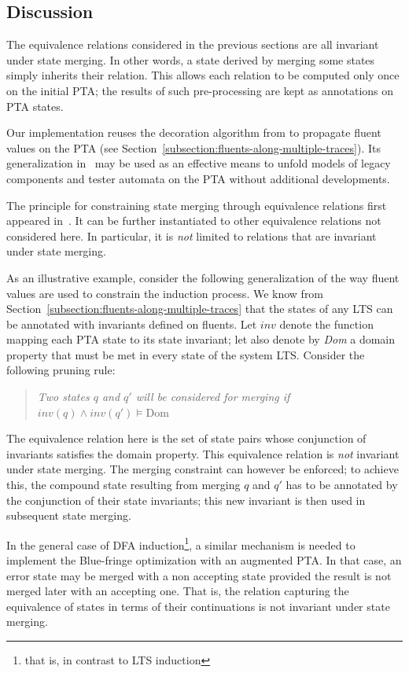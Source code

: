 \subsection{Discussion\label{subsection:qsm-constraints-implementation-notes}}

The equivalence relations considered in the previous sections are all invariant under state merging. In other words, a state derived by merging some states simply inherits their relation. This allows each relation to be computed only once on the initial PTA; the results of such pre-processing are kept as annotations on PTA states. 

Our implementation reuses the decoration algorithm from \cite{Damas:2006} to propagate fluent values on the PTA (see Section~\ref{subsection:fluents-along-multiple-traces}). Its generalization in~\cite{Damas:2011} may be used as an effective means to unfold models of legacy components and tester automata on the PTA without additional developments.

The principle for constraining state merging through equivalence relations first appeared in~\cite{Coste:1998, Coste:2004}. It can be further instantiated to other equivalence relations not considered here. In particular, it is \emph{not} limited to relations that are invariant under state merging.

As an illustrative example, consider the following generalization of the way fluent values are used to constrain the induction process. We know from Section~\ref{subsection:fluents-along-multiple-traces} that the states of any LTS can be annotated with invariants defined on fluents. Let $inv$ denote the function mapping each PTA state to its state invariant; let also denote by \emph{Dom} a domain property that must be met in every state of the system LTS. Consider the following pruning rule:
\begin{quote}
\emph{Two states $q$ and $q'$ will be considered for merging if $inv(q) \wedge inv(q') \models \mbox{Dom}$}
\end{quote}

The equivalence relation here is the set of state pairs whose conjunction of invariants satisfies the domain property. This equivalence relation is \emph{not} invariant under state merging. The merging constraint can however be enforced; to achieve this, the compound state resulting from merging $q$ and $q'$ has to be annotated by the conjunction of their state invariants; this new invariant is then used in subsequent state merging.

In the general case of DFA induction\footnote{that is, in contrast to LTS induction}, a similar mechanism is needed to implement the Blue-fringe optimization with an augmented PTA. In that case, an error state may be merged with a non accepting state provided the result is not merged later with an accepting one. That is, the relation capturing the equivalence of states in terms of their continuations is not invariant under state merging.
